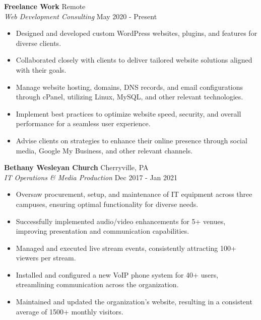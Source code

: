 \documentclass[letterpaper]{article}
\begin{document}
\vspace{-1mm}
\textbf{Freelance Work} \hfill Remote \\
\textit{Web Development Consulting} \hfill May 2020 - Present\\
\vspace{-1mm}
\begin{itemize} \itemsep -1pt
	\item Designed and developed custom WordPress websites, plugins, and features for diverse clients.
	\item Collaborated closely with clients to deliver tailored website solutions aligned with their goals.
	\item Manage website hosting, domains, DNS records, and email configurations through cPanel, utilizing Linux, MySQL, and other relevant technologies.
	\item Implement best practices to optimize website speed, security, and overall performance for a seamless user experience.
	\item Advise clients on strategies to enhance their online presence through social media, Google My Business, and other relevant channels.
\end{itemize}
\textbf{Bethany Wesleyan Church} \hfill Cherryville, PA\\
\textit{IT Operations \& Media Production} \hfill Dec 2017 - Jan 2021\\
\vspace{-1mm}
\begin{itemize} \itemsep -1pt
	\item Oversaw procurement, setup, and maintenance of IT equipment across three campuses, ensuring optimal functionality for diverse needs.
	\item Successfully implemented audio/video enhancements for 5+ venues, improving presentation and communication capabilities.
	\item Managed and executed live stream events, consistently attracting 100+ viewers per stream.
    \item Installed and configured a new VoIP phone system for 40+ users, streamlining communication across the organization.
    \item Maintained and updated the organization's website, resulting in a consistent average of 1500+ monthly visitors.
\end{itemize}
\end{document}
